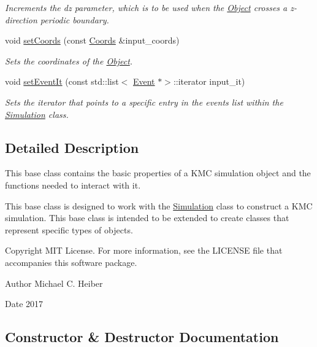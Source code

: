 \begin{DoxyCompactItemize}
\begin{DoxyCompactList}\small\item\em Increments the dz parameter, which is to be used when the \hyperlink{class_object}{Object} crosses a z-\/direction periodic boundary. \end{DoxyCompactList}\item 
void \hyperlink{class_object_a34a164e4709e5daaba7a38c3d61ae617}{set\+Coords} (const \hyperlink{struct_coords}{Coords} \&input\+\_\+coords)
\begin{DoxyCompactList}\small\item\em Sets the coordinates of the \hyperlink{class_object}{Object}. \end{DoxyCompactList}\item 
void \hyperlink{class_object_ad5025bd84ae91d6426f458f32e582293}{set\+Event\+It} (const std\+::list$<$ \hyperlink{class_event}{Event} $\ast$$>$\+::iterator input\+\_\+it)
\begin{DoxyCompactList}\small\item\em Sets the iterator that points to a specific entry in the events list within the \hyperlink{class_simulation}{Simulation} class. \end{DoxyCompactList}\end{DoxyCompactItemize}


\subsection{Detailed Description}
This base class contains the basic properties of a K\+MC simulation object and the functions needed to interact with it. 

This base class is designed to work with the \hyperlink{class_simulation}{Simulation} class to construct a K\+MC simulation. This base class is intended to be extended to create classes that represent specific types of objects. \begin{DoxyCopyright}{Copyright}
M\+IT License. For more information, see the L\+I\+C\+E\+N\+SE file that accompanies this software package. 
\end{DoxyCopyright}
\begin{DoxyAuthor}{Author}
Michael C. Heiber 
\end{DoxyAuthor}
\begin{DoxyDate}{Date}
2017 
\end{DoxyDate}


\subsection{Constructor \& Destructor Documentation}
\mbox{\label{class_object_aff050a622272cc7667251c7315f09fd7}} 

